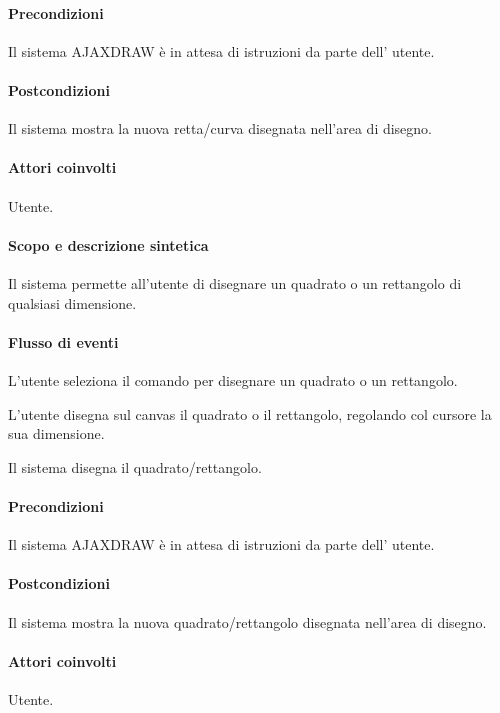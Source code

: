 \paragraph{Precondizioni} Il sistema AJAXDRAW \`e in attesa di istruzioni da parte dell' utente.
\paragraph{Postcondizioni} Il sistema mostra la nuova retta/curva disegnata nell'area di disegno.

\paragraph{Attori coinvolti} Utente.
\paragraph{Scopo e descrizione sintetica} 
Il sistema permette all'utente di disegnare un quadrato o un rettangolo di qualsiasi dimensione.
\paragraph{Flusso di eventi}
\begin{elenconumerato}[\textbf{}]{\subsubsecindent}
\item L'utente seleziona il comando per disegnare un quadrato o un rettangolo.
\item L'utente disegna sul canvas il quadrato o il rettangolo, regolando col cursore la sua dimensione.
\item Il sistema disegna il quadrato/rettangolo.
\end{elenconumerato}
\paragraph{Precondizioni} Il sistema AJAXDRAW \`e in attesa di istruzioni da parte dell' utente.
\paragraph{Postcondizioni} Il sistema mostra la nuova quadrato/rettangolo disegnata nell'area di disegno.

\paragraph{Attori coinvolti} Utente.
